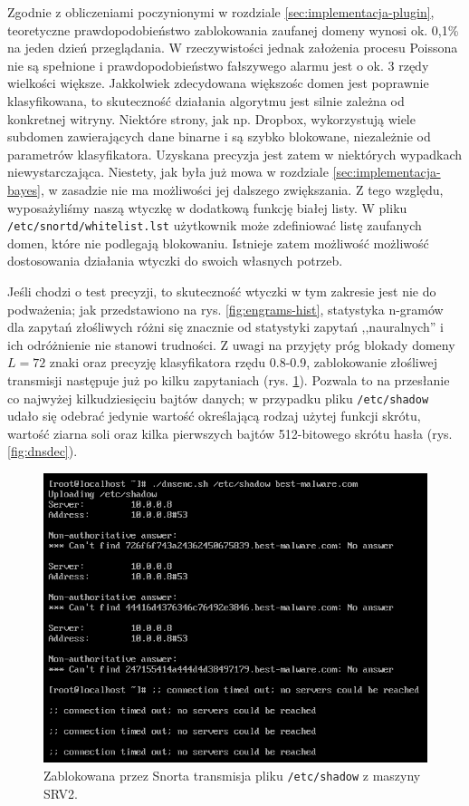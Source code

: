 \documentclass{eiti-raport}
\begin{document}
Zgodnie z obliczeniami poczynionymi w rozdziale \ref{sec:implementacja-plugin}, teoretyczne prawdopodobieństwo zablokowania zaufanej domeny wynosi ok. 0,1\% na jeden dzień przeglądania. W rzeczywistości jednak założenia procesu Poissona nie są spełnione i prawdopodobieństwo fałszywego alarmu jest o ok. 3 rzędy wielkości większe. Jakkolwiek zdecydowana większośc domen jest poprawnie klasyfikowana, to skuteczność działania algorytmu jest silnie zależna od konkretnej witryny. Niektóre strony, jak np. Dropbox, wykorzystują wiele subdomen zawierających dane binarne i są szybko blokowane, niezależnie od parametrów klasyfikatora. Uzyskana precyzja jest zatem w niektórych wypadkach niewystarczająca. Niestety, jak była już mowa w rozdziale \ref{sec:implementacja-bayes}, w zasadzie nie ma możliwości jej dalszego zwiększania. Z tego względu, wyposażyliśmy naszą wtyczkę w dodatkową funkcję białej listy. W pliku \texttt{/etc/snortd/whitelist.lst} użytkownik może zdefiniować listę zaufanych domen, które nie podlegają blokowaniu. Istnieje zatem możliwość możliwość dostosowania działania wtyczki do swoich własnych potrzeb. 

Jeśli chodzi o test precyzji, to skuteczność wtyczki w tym zakresie jest nie do podważenia; jak przedstawiono na rys. \ref{fig:engrams-hist}, statystyka n-gramów dla zapytań złośliwych różni się znacznie od statystyki zapytań ,,nauralnych'' i ich odróżnienie nie stanowi trudności. Z uwagi na przyjęty próg blokady domeny $L = 72$ znaki oraz precyzję klasyfikatora rzędu 0.8-0.9, zablokowanie złośliwej transmisji następuje już po kilku zapytaniach (rys. \ref{fig:dnsenc}). Pozwala to na przesłanie co najwyżej kilkudziesięciu bajtów danych; w przypadku pliku \texttt{/etc/shadow} udało się odebrać jedynie wartość określającą rodzaj użytej funkcji skrótu, wartość ziarna soli oraz kilka pierwszych bajtów 512-bitowego skrótu hasła (rys. \ref{fig:dnsdec}). 

\begin{figure}[!h] \centering
	\includegraphics[width=0.95\linewidth]{img/dnsenc.PNG}
	\caption{Zablokowana przez Snorta transmisja pliku \texttt{/etc/shadow} z maszyny SRV2.} \label{fig:dnsenc}
\end{figure}
\end{document}
